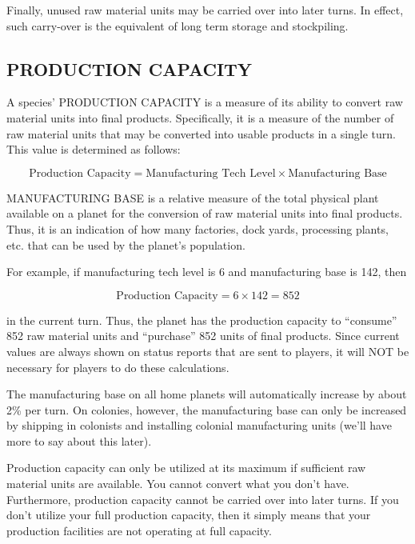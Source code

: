 \documentclass[10pt,titlepage]{article}
\begin{document}
Finally, unused raw material units may be carried over into later turns.  In
effect, such carry-over is the equivalent of long term storage and stockpiling.


\subsection{PRODUCTION CAPACITY}
\label{sec:productioncapacity}


A species' PRODUCTION CAPACITY is a measure of its ability to convert raw
material units into final products.  Specifically, it is a measure of the
number of raw material units that may be converted into usable products in
a single turn.  This value is determined as follows:

\begin{equation*}
  \textrm{Production Capacity}  =  \textrm{Manufacturing Tech Level}  \times  \textrm{Manufacturing Base}
\end{equation*}

MANUFACTURING BASE is a relative measure of the total physical plant available
on a planet for the conversion of raw material units into final products.
Thus, it is an indication of how many factories, dock yards, processing plants,
etc. that can be used by the planet's population.

For example, if manufacturing tech level is 6 and manufacturing base is 142,
then

\begin{equation*}
	\textrm{Production Capacity}  =  6  \times  142  =  852
\end{equation*}

in the current turn.  Thus, the planet has the production capacity to ``consume''
852 raw material units and ``purchase'' 852 units of final products.  Since
current values are always shown on status reports that are sent to players,
it will NOT be necessary for players to do these calculations.

The manufacturing base on all home planets will automatically increase by
about 2\% per turn.  On colonies, however, the manufacturing base can only be
increased by shipping in colonists and installing colonial manufacturing units
(we'll have more to say about this later).

Production capacity can only be utilized at its maximum if sufficient raw
material units are available.  You cannot convert what you don't have.
Furthermore, production capacity cannot be carried over into later turns.  If
you don't utilize your full production capacity, then it simply means that
your production facilities are not operating at full capacity.
\end{document}
